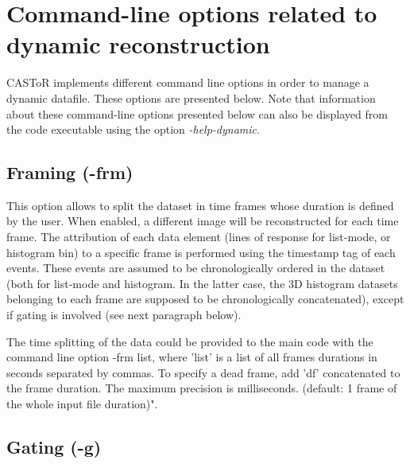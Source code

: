 \documentclass[a4paper, 11pt]{article}
\begin{document}
\clearpage
\section{Command-line options related to dynamic reconstruction}

CASToR implements different command line options in order to manage a dynamic datafile. These options are presented below. Note that information about these command-line options presented below can also be displayed from the code executable using the option \textit{-help-dynamic}.

\subsection{Framing (-frm)}
This option allows to split the dataset in time frames whose duration is defined by the user. When enabled, a different image will be reconstructed for each time frame. The attribution of each data element (lines of response for list-mode, or histogram bin) to a specific frame is performed using the timestamp tag of each events. These events are assumed to be chronologically ordered in the dataset (both for list-mode and histogram. In the latter case, the 3D histogram datasets belonging to each frame are supposed to be chronologically concatenated), except if gating is involved (see next paragraph below).




The time splitting of the data could be provided to the main code with the command line option  -frm list, where 'list' is a list of all frames durations in seconds separated by commas. To specify a dead frame, add 'df' concatenated to the frame duration. The maximum precision is milliseconds. (default: 1 frame of the whole input file duration)".
 

\subsection{Gating (-g)}

\end{document}
